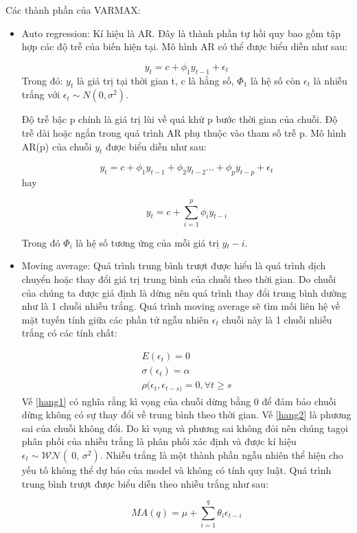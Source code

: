 Các thành phần của VARMAX:
\begin{itemize}
		\item Auto regression: Kí hiệu là AR. Đây là thành phần tự hồi quy bao	gồm tập hợp các độ trễ của biến hiện tại. Mô hình AR có thể được biểu diễn như sau:\par
		\begin{equation}
		    y_{t}=c+\phi_{1}y_{t-1}+\epsilon_{t}
		\end{equation}
		Trong đó: $y_t$ là giá trị tại thời gian t, c là hằng số, $\Phi_1$ là hệ số còn $\epsilon_t$ là nhiễu trắng với $\epsilon_t \sim N(0, \sigma^2)$.
		
		Độ trễ bậc p chính là giá trị lùi về quá khứ p bước thời gian của chuỗi. Độ trễ dài hoặc ngắn trong quá trình AR phụ thuộc vào tham số trễ p. Mô hình AR(p) của chuỗi $y_t$ được biểu diễn như sau:\par
		\begin{equation}
		    y_{t}=c+\phi_{1}y_{t-1}+\phi_{2}y_{t-2}...+\phi_{p}y_{t-p}+\epsilon_{t}
		\end{equation}
		    hay\par
		\begin{equation}
		    y_{t}=c+\sum_{i=1}^{p}\phi_{i}y_{t-i}
		\end{equation}
		
		    Trong đó $\Phi_i$ là hệ số tương ứng của mỗi giá trị $y{_t-i}$.\par
		\item 	Moving average: Quá trình trung bình trượt được hiểu là quá trình dịch chuyển hoặc thay đổi giá trị trung bình của chuỗi theo thời gian. Do chuỗi của chúng ta được giả định là dừng nên quá trình thay đổi trung bình dường như là 1 chuỗi nhiễu trắng. Quá trình moving average sẽ tìm mối liên hệ về mặt tuyến tính giữa các phần tử ngẫu nhiên $\epsilon_t$ chuỗi này là 1 chuỗi nhiễu trắng có các tính chất:\par
		\begin{align}
		    E(\epsilon_{t})=0\label{hang1}\\
		    \sigma(\epsilon_{t})=\alpha	\label{hang2}\\
		     \rho(\epsilon_{t},\epsilon_{t-s)}=0, \forall  t\geq s\label{hang3}
		\end{align}
		Vế \eqref{hang1} có nghĩa rằng kì vọng của chuỗi dừng bằng 0 để đảm bảo chuỗi dừng không có sự thay đổi về trung bình theo thời gian. Vế \eqref{hang2} là phương sai của chuỗi không đổi. Do kì vọng và phương sai không đỏi nên chúng tagọi phân phối của nhiễu trắng là phân phối xác định và được kí hiệu $\epsilon_t \sim \mathcal{WN}(\ {0},\,\sigma^{2})$. Nhiễu trắng là một thành phần ngẫu nhiên thể hiện cho yếu tố không thể dự báo của model và không có tính quy luật. Quá trình trung bình trượt được biểu diễn theo nhiễu trắng như sau:\par
		\begin{equation}
		    MA(q)=\mu+\sum_{i=1}^{q}\theta_{i}\epsilon_{t-i}
		\end{equation}
	\end{itemize}

